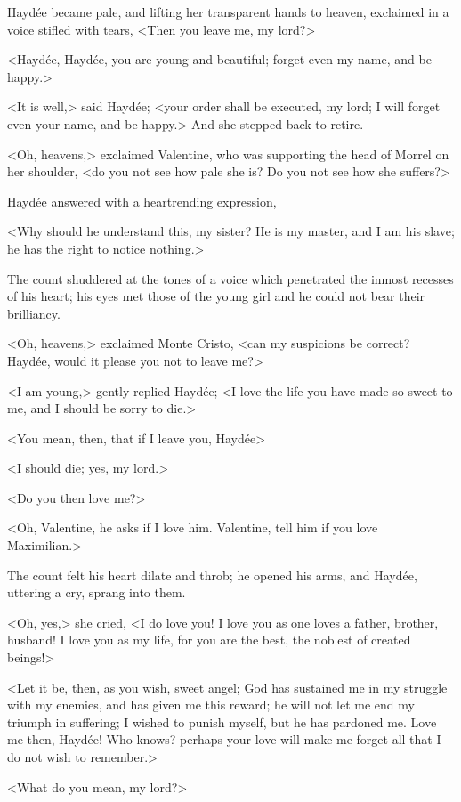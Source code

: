  Haydée became pale, and lifting her transparent hands to heaven, exclaimed in a voice stifled with tears, <Then you leave me, my lord?> 

 <Haydée, Haydée, you are young and beautiful; forget even my name, and be happy.> 

 <It is well,> said Haydée; <your order shall be executed, my lord; I will forget even your name, and be happy.> And she stepped back to retire. 

 <Oh, heavens,> exclaimed Valentine, who was supporting the head of Morrel on her shoulder, <do you not see how pale she is? Do you not see how she suffers?> 

 Haydée answered with a heartrending expression, 

 <Why should he understand this, my sister? He is my master, and I am his slave; he has the right to notice nothing.> 

 The count shuddered at the tones of a voice which penetrated the inmost recesses of his heart; his eyes met those of the young girl and he could not bear their brilliancy. 

 <Oh, heavens,> exclaimed Monte Cristo, <can my suspicions be correct? Haydée, would it please you not to leave me?> 

 <I am young,> gently replied Haydée; <I love the life you have made so sweet to me, and I should be sorry to die.> 

 <You mean, then, that if I leave you, Haydée\longdash> 

 <I should die; yes, my lord.> 

 <Do you then love me?> 

 <Oh, Valentine, he asks if I love him. Valentine, tell him if you love Maximilian.> 

 The count felt his heart dilate and throb; he opened his arms, and Haydée, uttering a cry, sprang into them. 

 <Oh, yes,> she cried, <I do love you! I love you as one loves a father, brother, husband! I love you as my life, for you are the best, the noblest of created beings!>

<Let it be, then, as you wish, sweet angel; God has sustained me in my struggle with my enemies, and has given me this reward; he will not let me end my triumph in suffering; I wished to punish myself, but he has pardoned me. Love me then, Haydée! Who knows? perhaps your love will make me forget all that I do not wish to remember.> 

 <What do you mean, my lord?> 

